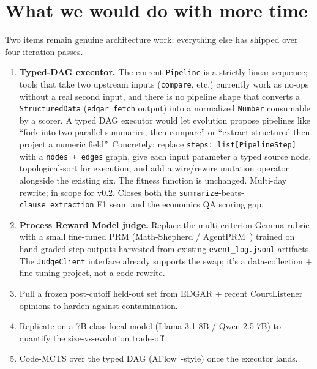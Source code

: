 \documentclass[11pt,a4paper]{article}
\begin{document}
\section{What we would do with more time}
Two items remain genuine architecture work; everything else has shipped over four iteration passes.
\begin{enumerate}[leftmargin=1.2em]
\item \textbf{Typed-DAG executor.} The current \texttt{Pipeline} is a strictly linear sequence; tools that take two upstream inputs (\texttt{compare}, etc.) currently work as no-ops without a real second input, and there is no pipeline shape that converts a \texttt{StructuredData} (\texttt{edgar\_fetch} output) into a normalized \texttt{Number} consumable by a scorer. A typed DAG executor would let evolution propose pipelines like ``fork into two parallel summaries, then compare'' or ``extract structured then project a numeric field''. Concretely: replace \texttt{steps: list[PipelineStep]} with a \texttt{nodes + edges} graph, give each input parameter a typed source node, topological-sort for execution, and add a wire/rewire mutation operator alongside the existing six. The fitness function is unchanged. Multi-day rewrite; in scope for v0.2. Closes both the \texttt{summarize}-beats-\texttt{clause\_extraction} F1 seam and the economics QA scoring gap.
\item \textbf{Process Reward Model judge.} Replace the multi-criterion Gemma rubric with a small fine-tuned PRM (Math-Shepherd / AgentPRM~\cite{agentprm2025}) trained on hand-graded step outputs harvested from existing \texttt{event\_log.jsonl} artifacts. The \texttt{JudgeClient} interface already supports the swap; it's a data-collection + fine-tuning project, not a code rewrite.
\item Pull a frozen post-cutoff held-out set from EDGAR + recent CourtListener opinions to harden against contamination.
\item Replicate on a 7B-class local model (Llama-3.1-8B / Qwen-2.5-7B) to quantify the size-vs-evolution trade-off.
\item Code-MCTS over the typed DAG (AFlow~\cite{aflow2024}-style) once the executor lands.
\end{enumerate}
\end{document}
